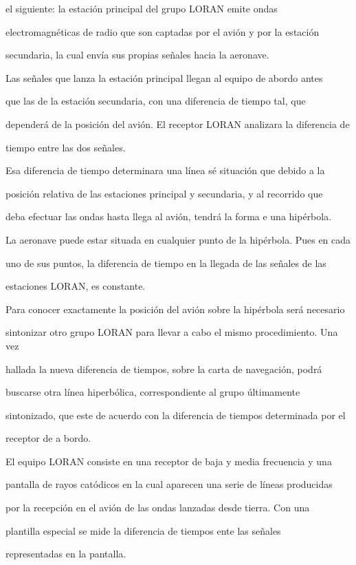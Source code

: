 el siguiente: la estación principal del grupo LORAN emite ondas

electromagnéticas de radio que son captadas por el avión y por la estación

secundaria, la cual envía sus propias señales hacia la aeronave.

Las señales que lanza la estación  principal llegan al equipo de abordo antes

que las de la estación secundaria, con una diferencia de tiempo tal, que

dependerá de la posición del avión. El receptor LORAN analizara la diferencia de

tiempo entre las dos señales.

Esa diferencia de tiempo determinara una línea sé situación que debido a la

posición  relativa de las estaciones principal y secundaria, y al recorrido que

deba efectuar las ondas hasta llega al avión, tendrá la forma e una hipérbola.

La aeronave puede estar situada en cualquier punto de la hipérbola. Pues en cada

uno de sus puntos, la diferencia de tiempo en la llegada de las señales de las

estaciones  LORAN, es constante.

Para conocer exactamente la posición del avión sobre la hipérbola será necesario

sintonizar otro grupo LORAN para llevar a cabo el mismo procedimiento. Una vez

hallada la nueva diferencia de tiempos, sobre la carta de navegación, podrá

buscarse otra línea hiperbólica, correspondiente al grupo últimamente

sintonizado, que este de acuerdo con la diferencia de tiempos determinada por el

receptor de a bordo.

El equipo LORAN consiste en una receptor de baja y media frecuencia y una

pantalla de rayos catódicos en la cual aparecen  una serie de líneas producidas

por la recepción en el avión de las ondas lanzadas desde tierra. Con una

plantilla especial se mide la diferencia de tiempos ente las señales

representadas en la pantalla.
